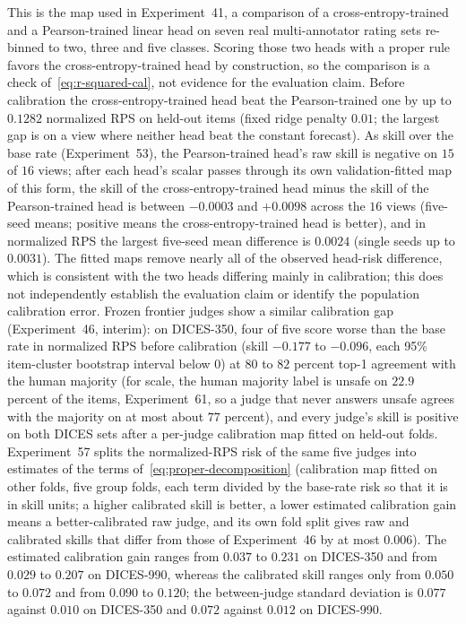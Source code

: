 This is the map used in Experiment~41, a comparison of a cross-entropy-trained and a Pearson-trained linear head on seven real multi-annotator rating sets re-binned to two, three and five classes.
Scoring those two heads with a proper rule favors the cross-entropy-trained head by construction, so the comparison is a check of~\eqref{eq:r-squared-cal}, not evidence for the evaluation claim.
Before calibration the cross-entropy-trained head beat the Pearson-trained one by up to $0.1282$ normalized RPS on held-out items (fixed ridge penalty $0.01$; the largest gap is on a view where neither head beat the constant forecast).
As skill over the base rate (Experiment~53), the Pearson-trained head's raw skill is negative on $15$ of $16$ views; after each head's scalar passes through its own validation-fitted map of this form, the skill of the cross-entropy-trained head minus the skill of the Pearson-trained head is between $-0.0003$ and $+0.0098$ across the $16$ views (five-seed means; positive means the cross-entropy-trained head is better), and in normalized RPS the largest five-seed mean difference is $0.0024$ (single seeds up to $0.0031$).
The fitted maps remove nearly all of the observed head-risk difference, which is consistent with the two heads differing mainly in calibration; this does not independently establish the evaluation claim or identify the population calibration error.
Frozen frontier judges show a similar calibration gap (Experiment~46, interim): on DICES-350, four of five score worse than the base rate in normalized RPS before calibration (skill $-0.177$ to $-0.096$, each 95\% item-cluster bootstrap interval below $0$) at $80$ to $82$ percent top-1 agreement with the human majority (for scale, the human majority label is unsafe on $22.9$ percent of the items, Experiment~61, so a judge that never answers unsafe agrees with the majority on at most about $77$ percent), and every judge's skill is positive on both DICES sets after a per-judge calibration map fitted on held-out folds.
Experiment~57 splits the normalized-RPS risk of the same five judges into estimates of the terms of~\eqref{eq:proper-decomposition} (calibration map fitted on other folds, five group folds, each term divided by the base-rate risk so that it is in skill units; a higher calibrated skill is better, a lower estimated calibration gain means a better-calibrated raw judge, and its own fold split gives raw and calibrated skills that differ from those of Experiment~46 by at most $0.006$).
The estimated calibration gain ranges from $0.037$ to $0.231$ on DICES-350 and from $0.029$ to $0.207$ on DICES-990, whereas the calibrated skill ranges only from $0.050$ to $0.072$ and from $0.090$ to $0.120$; the between-judge standard deviation is $0.077$ against $0.010$ on DICES-350 and $0.072$ against $0.012$ on DICES-990.
